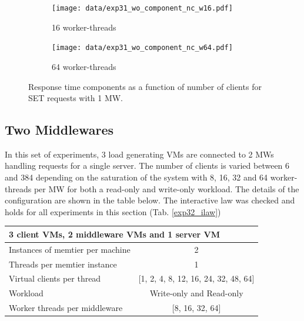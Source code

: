 \documentclass[report.tex]{subfiles}
\begin{document}
\begin{figure}[H]
	\begin{subfigure}[b]{.499\linewidth}
		\centering
		\texttt{[image: data/exp31\_wo\_component\_nc\_w16.pdf]}
		\caption{16 worker-threads}
	\end{subfigure}\hfill
	\begin{subfigure}[b]{.499\linewidth}
		\centering
		\texttt{[image: data/exp31\_wo\_component\_nc\_w64.pdf]}
		\caption{64 worker-threads}
	\end{subfigure}\hfill
	\caption{Response time components as a function of number of clients for SET requests with 1 MW.}\label{exp31_wo_component_nc}
\end{figure}


\subsection{Two Middlewares}\label{exp32}


In this set of experiments, 3 load generating VMs are connected to 2 MWs handling requests for a single server. 
The number of clients is varied between 6 and 384 depending on the saturation of the system with 8, 16, 32 and 64 worker-threads 
per MW for both a read-only and write-only workload. The details of the configuration are shown in the table below.
The interactive law was checked and holds for all experiments in this section (Tab. \ref{exp32_ilaw})

\begin{center}
	\scriptsize{
		\begin{tabular}{|l|c|}
			\multicolumn{2}{l}{3 client VMs, 2 middleware VMs and 1 server VM}\\
			\hline Instances of memtier per machine & 2                        \\ 
			\hline Threads per memtier instance     & 1                        \\
			\hline Virtual clients per thread       & [1, 2, 4, 8, 12, 16, 24, 32, 48, 64] \\ 
			\hline Workload                         & Write-only and Read-only \\
			\hline Worker threads per middleware    & [8, 16, 32, 64]                  \\
			\hline 
		\end{tabular}
	} 
\end{center}
\end{document}
